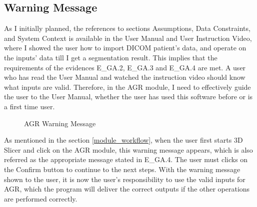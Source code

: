 \subsection{Warning Message}

As I initially planned, the references to sections Assumptions, Data Constraints, and System Context is available in the User Manual and User Instruction Video, where I showed the user how to import DICOM patient's data, and operate on the inputs' data till I get a segmentation result. This implies that the requirements of  the evidences E\_GA.2, E\_GA.3 and E\_GA.4 are met. A user who has read the User Manual and watched the instruction video should know what inputs are valid. Therefore, in the AGR module, I need to effectively guide the user to the User Manual, whether the user has used this software before or is a first time user.

\begin{figure}[H]
    \centering
    \caption[AGR Warning Message]{AGR Warning Message}
    \label{fig_agr_ac_wm}
\end{figure}

As mentioned in the section \ref{module_workflow}, when the user first starts 3D Slicer and click on the AGR module, this warning message appears, which is also referred as the appropriate message stated in E\_GA.4. The user must clicks on the Confirm button to continue to the next steps. With the warning message shown to the user, it is now the user's responsibility to use the valid inputs for AGR, which the program will deliver the correct outputs if the other operations are performed correctly. 

%
